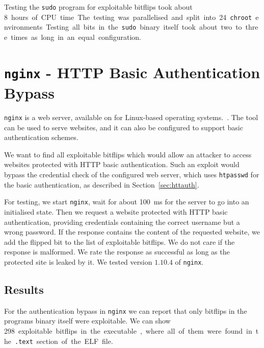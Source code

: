 Testing the \texttt{sudo} program for exploitable bitflips took about \SI{8}
hours of CPU time. The testing was parallelised and split into 24
\texttt{chroot} environments. Testing all bits in the \texttt{sudo} binary
itself took about two to three times as long in an equal configuration.

\section{\texttt{nginx} - HTTP Basic Authentication Bypass}

\texttt{nginx} is a web server, available on for Linux-based operating
systems.~\cite{nginxweb}. The tool can be used to serve websites, and it can
also be configured to support basic authentication schemes.

We want to find all exploitable bitflips which would allow an attacker to access
websites protected with HTTP basic authentication. Such an exploit would bypass
the credential check of the configured web server, which uses \texttt{htpasswd}
for the basic authentication, as described in Section~\ref{sec:httauth}.

For testing, we start \texttt{nginx}, wait for about \SI{100}{\milli\second} for
the server to go into an initialised state. Then we request a website protected
with HTTP basic authentication, providing credentials containing the correct
username but a wrong password. If the response contains the content of the
requested website, we add the flipped bit to the list of exploitable bitflips.
We do not care if the response is malformed. We rate the response as successful
as long as the protected site is leaked by it. We tested version $1.10.4$ of
\texttt{nginx}.

\subsection{Results}

For the authentication bypass in \texttt{nginx} we can report that only bitflips
in the program\textquotesingle s binary itself were exploitable. We can show
\SI{298} exploitable bitflips in the executable, where all of them were found in
the \texttt{.text} section of the ELF file.


